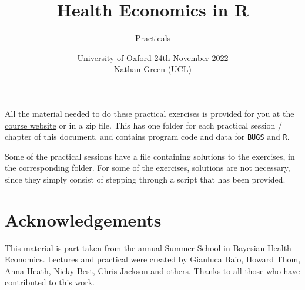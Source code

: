 \documentclass[a4paper,twoside,openany]{svmonoBUGS}
\title{Health Economics in R}
\author{Practicals}
\date{University of Oxford 24th November 2022 \\ Nathan Green (UCL)}
\newcommand{\bugs}{{\texttt{BUGS}}\xspace}
\newcommand{\R}{{\texttt{R}}\xspace}
\begin{document}
\maketitle
\tableofcontents

\preface

All the material needed to do these practical exercises is provided for you at the \href{https://n8thangreen.github.io/Stockholm-health-economics-course/}{course website} or in a zip file. This has one folder for each practical session / chapter of this document, and contains program code and data for \bugs and \R.

Some of the practical sessions have a file containing solutions to the exercises, in the corresponding folder.   For some of the exercises, solutions are not necessary, since they simply consist of stepping through a script that has been provided.

\section{Acknowledgements}
This material is part taken from the annual Summer School in Bayesian Health Economics.
Lectures and practical were created by Gianluca Baio, Howard Thom, Anna Heath, Nicky Best, Chris Jackson and others.
Thanks to all those who have contributed to this work. 




\end{document}

